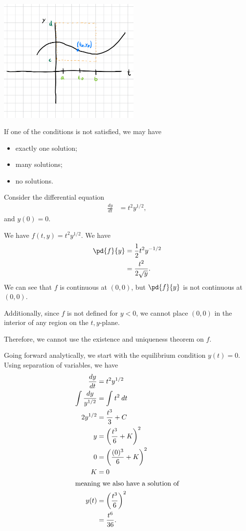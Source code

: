 \documentclass[10pt]{mypackage}
\begin{document}
\begin{center}
  \includegraphics[width=7cm]{images/existence_uniqueness.png}
\end{center}
If one of the conditions is not satisfied, we may have
\begin{itemize}
  \item exactly one solution;
  \item many solutions;
  \item no solutions.
\end{itemize}
\begin{example}
  Consider the differential equation
  \begin{align*}
    \frac{dy}{dt} &= t^2 y^{1/2},
  \end{align*}
  and $y(0) = 0$.\newline

  We have $f(t,y) = t^2 y^{1/2}$. We have
  \begin{align*}
    \pd{f}{y} &= \frac{1}{2}t^2y^{-1/2}\\
              &= \frac{t^2}{2\sqrt{y}}.
  \end{align*}
  We can see that $f$ is continuous at $(0,0)$, but $\pd{f}{y}$ is not continuous at $(0,0)$.\newline

  Additionally, since $f$ is not defined for $y < 0$, we cannot place $(0,0)$ in the interior of any region on the $t,y$-plane.\newline

  Therefore, we cannot use the existence and uniqueness theorem on $f$.\newline

  Going forward analytically, we start with the equilibrium condition $y(t) = 0$. Using separation of variables, we have
  \begin{align*}
    \frac{dy}{dt} &= t^2y^{1/2}\\
    \int\frac{dy}{y^{1/2}} &= \int_{}^{} t^2\:dt\\
    2y^{1/2} &= \frac{t^3}{3} + C\\
    y &= \left(\frac{t^3}{6} + K\right)^{2}\\
    0 &= \left(\frac{(0)^3}{6} + K\right)^{2}\\
    K &= 0\\
    \intertext{meaning we also have a solution of}
    y(t) &= \left(\frac{t^3}{6}\right)^{2}\\
         &= \frac{t^6}{36}.
  \end{align*}
\end{example}
\end{document}
